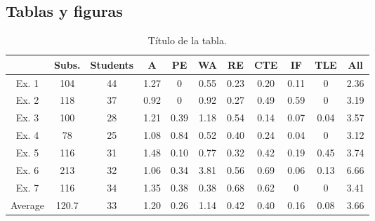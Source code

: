 \documentclass[12pt,twoside,titlepage]{report}
\begin{document}
\subsection{Tablas y figuras}

\begin{table}
  \centering
  \caption{Título de la tabla.}
  \label{tab:una_tabla}

\begin{footnotesize}
\renewcommand{\arraystretch}{1.5} %
\begin{tabular}{ccccccccccc}
  \hline
   & Subs. & Students & A & PE & WA & RE & CTE & IF & TLE & All\\
  \hline
Ex. 1 & 104 & 44 & 1.27    &   0       &   0.55    &   0.23    &   0.20    &   0.11    &   0     & 2.36  \\
Ex. 2 & 118 & 37 & 0.92    &   0       &   0.92    &   0.27    &   0.49    &   0.59    &   0     & 3.19  \\
Ex. 3 & 100 & 28 & 1.21    &   0.39    &   1.18    &   0.54    &   0.14    &   0.07    &   0.04  & 3.57  \\
Ex. 4 & 78  & 25 & 1.08    &   0.84    &   0.52    &   0.40    &   0.24    &   0.04    &   0     & 3.12  \\
Ex. 5 & 116 & 31 & 1.48    &   0.10    &   0.77    &   0.32    &   0.42    &   0.19    &   0.45  & 3.74  \\
Ex. 6 & 213 & 32 & 1.06    &   0.34    &   3.81    &   0.56    &   0.69    &   0.06    &   0.13  & 6.66  \\
Ex. 7 & 116 & 34 & 1.35    &   0.38    &   0.38    &   0.68    &   0.62    &   0       &   0     & 3.41  \\
  \hline
Average & 120.7 & 33 & 1.20 &  0.26 &  1.14 &  0.42 &  0.40 &  0.16 &  0.08 & 3.66 \\
  \hline
 \end{tabular}
\end{footnotesize}

\end{table}
\end{document}
